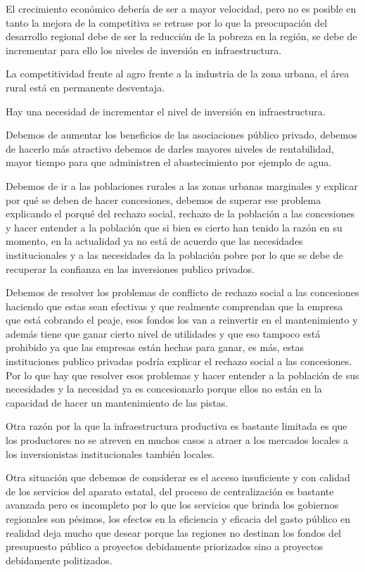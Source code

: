 \documentclass[
  a4paper,
]{article}
\begin{document}
El crecimiento económico debería de ser a mayor velocidad, pero no es
posible en tanto la mejora de la competitiva se retrase por lo que la
preocupación del desarrollo regional debe de ser la reducción de la
pobreza en la región, se debe de incrementar para ello los niveles de
inversión en infraestructura.

La competitividad frente al agro frente a la industria de la zona
urbana, el área rural está en permanente desventaja.

Hay una necesidad de incrementar el nivel de inversión en
infraestructura.

Debemos de aumentar los beneficios de las asociaciones público privado,
debemos de hacerlo más atractivo debemos de darles mayores niveles de
rentabilidad, mayor tiempo para que administren el abastecimiento por
ejemplo de agua.

Debemos de ir a las poblaciones rurales a las zonas urbanas marginales y
explicar por qué se deben de hacer concesiones, debemos de superar ese
problema explicando el porqué del rechazo social, rechazo de la
población a las concesiones y hacer entender a la población que si bien
es cierto han tenido la razón en su momento, en la actualidad ya no está
de acuerdo que las necesidades institucionales y a las necesidades da la
población pobre por lo que se debe de recuperar la confianza en las
inversiones publico privados.

Debemos de resolver los problemas de conflicto de rechazo social a las
concesiones haciendo que estas sean efectivas y que realmente comprendan
que la empresa que está cobrando el peaje, esos fondos los van a
reinvertir en el mantenimiento y además tiene que ganar cierto nivel de
utilidades y que eso tampoco está prohibido ya que las empresas están
hechas para ganar, es más, estas instituciones publico privadas podría
explicar el rechazo social a las concesiones. Por lo que hay que
resolver esos problemas y hacer entender a la población de sus
necesidades y la necesidad ya es concesionarlo porque ellos no están en
la capacidad de hacer un mantenimiento de las pistas.

Otra razón por la que la infraestructura productiva es bastante limitada
es que los productores no se atreven en muchos casos a atraer a los
mercados locales a los inversionistas institucionales también locales.

Otra situación que debemos de considerar es el acceso insuficiente y con
calidad de los servicios del aparato estatal, del proceso de
centralización es bastante avanzada pero es incompleto por lo que los
servicios que brinda los gobiernos regionales son pésimos, los efectos
en la eficiencia y eficacia del gasto público en realidad deja mucho que
desear porque las regiones no destinan los fondos del presupuesto
público a proyectos debidamente priorizados sino a proyectos debidamente
politizados.
\end{document}
